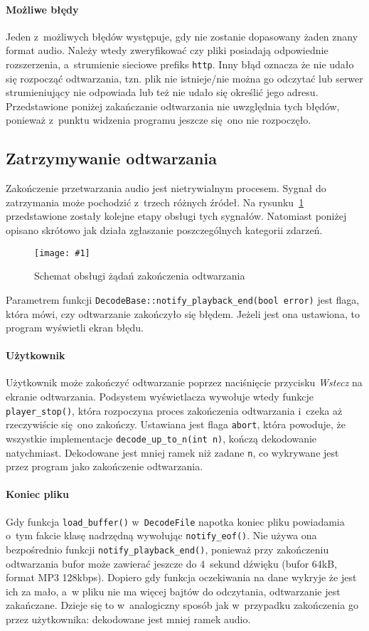 \documentclass[polish]{aghengthesis}
\newcommand{\imgint}[4]{
	\begin{figure}[{#4}]
		\centering
		\texttt{[image: \#1]}
		\caption{#2}
		\label{#1}
	\end{figure}
}
\newcommand{\imgh}[3]{\imgint{#1}{#2}{#3}{H}}
\begin{document}
			\paragraph{Możliwe błędy}
				Jeden z~możliwych błędów występuje, gdy nie zostanie dopasowany żaden znany format audio. Należy wtedy zweryfikować czy pliki posiadają odpowiednie rozszerzenia, a~strumienie sieciowe prefiks \lstinline|http|. Inny błąd oznacza że nie udało się rozpocząć odtwarzania, tzn. plik nie istnieje/nie można go odczytać lub serwer strumieniujący nie odpowiada lub też nie udało się określić jego adresu. Przedstawione poniżej zakańczanie odtwarzania nie uwzględnia tych błędów, ponieważ z~punktu widzenia programu jeszcze się ono nie rozpoczęło.
		
		\subsection{Zatrzymywanie odtwarzania}
			Zakończenie przetwarzania audio jest nietrywialnym procesem. Sygnał do zatrzymania może pochodzić z~trzech różnych źródeł. Na rysunku~\ref{3/PicoRadio-stop} przedstawione zostały kolejne etapy obsługi tych sygnałów. Natomiast poniżej opisano skrótowo jak działa zgłaszanie poszczególnych kategorii zdarzeń. 
			
			\imgh{3/PicoRadio-stop}{Schemat obsługi żądań zakończenia odtwarzania}{1}
			
			Parametrem funkcji \lstinline|DecodeBase::notify_playback_end(bool error)| jest flaga, która mówi, czy odtwarzanie zakończyło się błędem. Jeżeli jest ona ustawiona, to program wyświetli ekran błędu.
			
			\paragraph{Użytkownik}
				Użytkownik może zakończyć odtwarzanie poprzez naciśnięcie przycisku \textit{Wstecz} na ekranie odtwarzania. Podsystem wyświetlacza wywołuje wtedy funkcje \lstinline|player_stop()|, która rozpoczyna proces zakończenia odtwarzania i~czeka aż rzeczywiście się ono zakończy. Ustawiana jest flaga \lstinline|abort|, która powoduje, że wszystkie implementacje \lstinline|decode_up_to_n(int n)|, kończą dekodowanie natychmiast. Dekodowane jest mniej ramek niż zadane \lstinline|n|, co wykrywane jest przez program jako zakończenie odtwarzania.
			
			\paragraph{Koniec pliku}
				Gdy funkcja \lstinline|load_buffer()| w~\lstinline|DecodeFile| napotka koniec pliku powiadamia o~tym fakcie klasę nadrzędną wywołując \lstinline|notify_eof()|. Nie używa ona bezpośrednio funkcji \lstinline|notify_playback_end()|, ponieważ przy zakończeniu odtwarzania bufor może zawierać jeszcze do 4~sekund dźwięku (bufor 64kB, format MP3 128kbps). Dopiero gdy funkcja oczekiwania na dane wykryje że jest ich za mało, a~w pliku nie ma więcej bajtów do odczytania, odtwarzanie jest zakańczane. Dzieje się to w~analogiczny sposób jak w~przypadku zakończenia go przez użytkownika: dekodowane jest mniej ramek audio.
			
\end{document}
